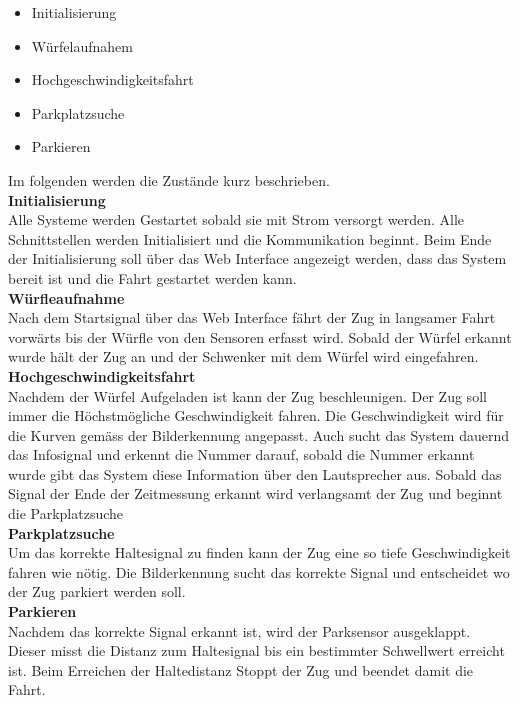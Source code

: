 \documentclass[../../main.tex]{subfiles}
\begin{document}
    \begin{itemize}
        \item Initialisierung
        \item Würfelaufnahem
        \item Hochgeschwindigkeitsfahrt
        \item Parkplatzsuche
        \item Parkieren
    \end{itemize}

    Im folgenden werden die Zustände kurz beschrieben.\\

    \textbf{Initialisierung}\\
    Alle Systeme werden Gestartet sobald sie mit Strom versorgt werden. Alle Schnittstellen werden Initialisiert und die Kommunikation beginnt. Beim Ende der Initialisierung soll über das Web Interface angezeigt werden, dass das System bereit ist und die Fahrt gestartet werden kann.\\

    \textbf{Würfleaufnahme}\\
    Nach dem Startsignal über das Web Interface fährt der Zug in langsamer Fahrt vorwärts bis der Würfle von den Sensoren erfasst wird. Sobald der Würfel erkannt wurde hält der Zug an und der Schwenker mit dem Würfel wird eingefahren.\\

    \textbf{Hochgeschwindigkeitsfahrt}\\
    Nachdem der Würfel Aufgeladen ist kann der Zug beschleunigen. Der Zug soll immer die Höchstmögliche Geschwindigkeit fahren. Die Geschwindigkeit wird für die Kurven gemäss der Bilderkennung angepasst. Auch sucht das System dauernd das Infosignal und erkennt die Nummer darauf, sobald die Nummer erkannt wurde gibt das System diese Information über den Lautsprecher aus. 
    Sobald das Signal der Ende der Zeitmessung erkannt wird verlangsamt der Zug und beginnt die Parkplatzsuche\\

    \textbf{Parkplatzsuche}\\
    Um das korrekte Haltesignal zu finden kann der Zug eine so tiefe Geschwindigkeit fahren wie nötig. Die Bilderkennung sucht das korrekte Signal und entscheidet wo der Zug parkiert werden soll.\\

    \textbf{Parkieren}\\
    Nachdem das korrekte Signal erkannt ist, wird der Parksensor ausgeklappt. Dieser misst die Distanz zum Haltesignal bis ein bestimmter Schwellwert erreicht ist. Beim Erreichen der Haltedistanz Stoppt der Zug und beendet damit die Fahrt.

    
\end{document}
